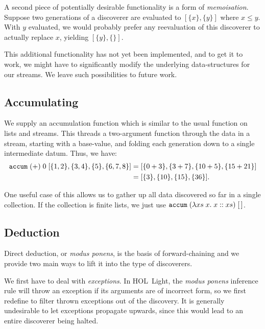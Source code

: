 A second piece of potentially desirable functionality is a form of \emph{memoisation}. Suppose two generations of a discoverer are evaluated to $[\{x\}, \{y\}]$ where $x \leq y$. With $y$ evaluated, we would probably prefer any reevaluation of this discoverer to actually replace $x$, yielding $[\{y\}, \{\}]$. 

This additional functionality has not yet been implemented, and to get it to work, we might have to significantly modify the underlying data-structures for our streams. We leave such possibilities to future work.

\subsection{Accumulating}
We supply an accumulation function which is similar to the usual  function on lists and streams. This threads a two-argument function through the data in a stream, starting with a base-value, and folding each generation down to a single intermediate datum. Thus, we have:
\begin{align*}
\texttt{accum}\;(+)\;0\;[\{1,2\}, \{3,4\}, \{5\}, \{6,7,8\}] 
&= [\{0 + 3\}, \{3 + 7\}, \{10 + 5\}, \{15 + 21\}]\\
&= [\{3\}, \{10\}, \{15\}, \{36\}].
\end{align*}

One useful case of this allows us to gather up all data discovered so far in a single collection. If the collection is finite lists, we just use $\texttt{accum}\;(\lambda xs\;x.\;x :: xs)\;[\,]$.


\subsection{Deduction}
Direct deduction, or \emph{modus ponens}, is the basis of forward-chaining and we provide two main ways to lift it into the type of discoverers. 

We first have to deal with \emph{exceptions}. In HOL~Light, the \emph{modus ponens} inference rule will throw an exception if its arguments are of incorrect form, so we first redefine  to filter thrown exceptions out of the discovery. It is generally undesirable to let exceptions propagate upwards, since this would lead to an entire discoverer being halted. 

